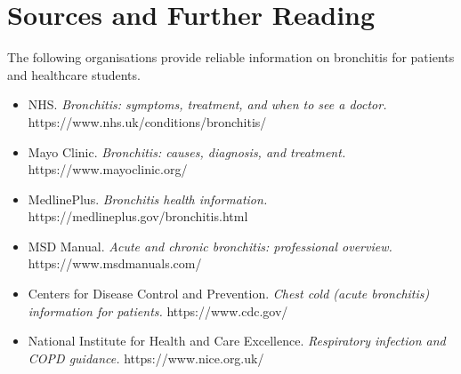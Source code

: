\section*{Sources and Further Reading}
The following organisations provide reliable information on bronchitis for patients and healthcare students.

\begin{itemize}
    \item NHS. \textit{Bronchitis: symptoms, treatment, and when to see a doctor.} https://www.nhs.uk/conditions/bronchitis/
    \item Mayo Clinic. \textit{Bronchitis: causes, diagnosis, and treatment.} https://www.mayoclinic.org/
    \item MedlinePlus. \textit{Bronchitis health information.} https://medlineplus.gov/bronchitis.html
    \item MSD Manual. \textit{Acute and chronic bronchitis: professional overview.} https://www.msdmanuals.com/
    \item Centers for Disease Control and Prevention. \textit{Chest cold (acute bronchitis) information for patients.} https://www.cdc.gov/
    \item National Institute for Health and Care Excellence. \textit{Respiratory infection and COPD guidance.} https://www.nice.org.uk/
\end{itemize}
